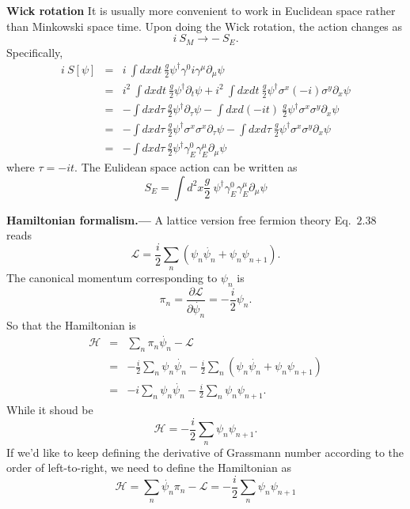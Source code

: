\documentclass[submission, PhysLectNotes]{SciPost}
\begin{document}
{\bf Wick rotation}
It is usually more convenient to work in Euclidean space rather than Minkowski space time. Upon doing the Wick rotation, the action changes as
\begin{equation}
    i\ S_M \rightarrow -\ S_E.
\end{equation}
Specifically,
\begin{eqnarray}
    i\ S[\psi] &=& i\ \int dxdt \ \frac{g}{2} \psi^\dagger \gamma^0 i\gamma^\mu \partial_\mu \psi \nonumber \\
    &=& i^2 \ \int dxdt \ \frac{g}{2} \psi^\dagger \partial_t \psi + i^2 \ \int dxdt \ \frac{g}{2} \psi^\dagger \sigma^x (-i) \sigma^y \partial_x \psi \nonumber \\
    &=& -\int dxd\tau \ \frac{g}{2} \psi^\dagger \partial_\tau \psi - \int dxd(-i t) \ \frac{g}{2} \psi^\dagger \sigma^x \sigma^y \partial_x \psi \nonumber \\
    &=&  -\int dxd\tau \ \frac{g}{2} \psi^\dagger \sigma^x\sigma^x\partial_\tau \psi - \int dxd\tau \ \frac{g}{2} \psi^\dagger \sigma^x \sigma^y \partial_x \psi \nonumber \\
    &=&  -\int dxd\tau \ \frac{g}{2} \psi^\dagger \gamma^0_E\gamma^\mu_E\partial_\mu \psi
\end{eqnarray}
where $\tau = -it$. The Eulidean space action can be written as
\begin{equation}
    S_E = \int d^2x \frac{g}{2} \ \psi^\dagger \gamma^0_E\gamma^\mu_E\partial_\mu \psi
\end{equation}

{\bf Hamiltonian formalism.---}
A lattice version free fermion theory Eq.~$2.38$ reads
\begin{equation}
    \mathcal{L} = \frac{i}{2} \sum_n \left( \psi_n \dot{\psi_n} + \psi_n \psi_{n+1}\right).
\end{equation}
The canonical momentum corresponding to $\psi_n$ is
\begin{equation}
    \pi_n = \frac{\partial \mathcal{L}}{\partial \dot{\psi_n}} = -\frac{i}{2}\psi_n.
\end{equation}
So that the Hamiltonian is
\begin{eqnarray}
    \mathcal{H} &=& \sum_n \pi_n \dot{\psi_n} - \mathcal{L} \nonumber\\
      &=& -\frac{i}{2}\sum_n\psi_n \dot{\psi_n} - \frac{i}{2} \sum_n \left( \psi_n \dot{\psi_n} + \psi_n \psi_{n+1}\right) \\
      &=& -i \sum_n\psi_n \dot{\psi_n} - \frac{i}{2} \sum_n \psi_n \psi_{n+1} \nonumber.
\end{eqnarray}
While it shoud be
\begin{equation}
    \mathcal{H} = -\frac{i}{2}\sum_n\psi_n \psi_{n+1}.
\end{equation}
If we'd like to keep defining the derivative of Grassmann number according to the order of left-to-right, we need to define the Hamiltonian as
\begin{equation}
    \mathcal{H} = \sum_n \dot{\psi_n} \pi_n - \mathcal{L} =  - \frac{i}{2} \sum_n \psi_n \psi_{n+1}
\end{equation}
\end{document}
